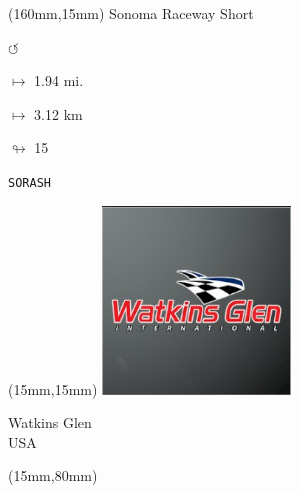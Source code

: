 \begin{textblock*}{40mm}(160mm,15mm)%
Sonoma Raceway Short
\par \Huge$\circlearrowleft$
\Large
\par$\mapsto$ 1.94 mi.
\par$\mapsto$ 3.12 km
\par$\looparrowright$ 15
\par\hfill\tiny\tt SORASH\\
\end{textblock*}
\null\newpage

\begin{textblock*}{50mm}(15mm,15mm)%
\includegraphics[width=50mm]{LG/2015-05-20_00097.png}
\par Watkins Glen\\ USA
\end{textblock*}
\begin{textblock*}{185mm}(15mm,80mm)%
\end{textblock*}
